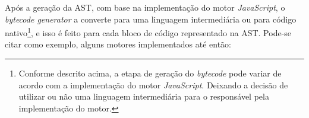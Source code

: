 \begin{figure}[h!]
    \centering
\end{figure}

Após a geração da AST, com base na implementação do motor \textit{JavaScript}, o
\textit{bytecode generator} a converte para uma linguagem intermediária ou para código
nativo\footnote[2]{Conforme descrito acima, a etapa de geração do \textit{bytecode} pode
variar de acordo com a implementação do motor \textit{JavaScript}. Deixando a decisão de
utilizar ou não uma linguagem intermediária para o responsável pela implementação do
motor.}, e isso é feito para cada bloco de código representado na AST. Pode-se citar como
exemplo, alguns motores implementados até então:

